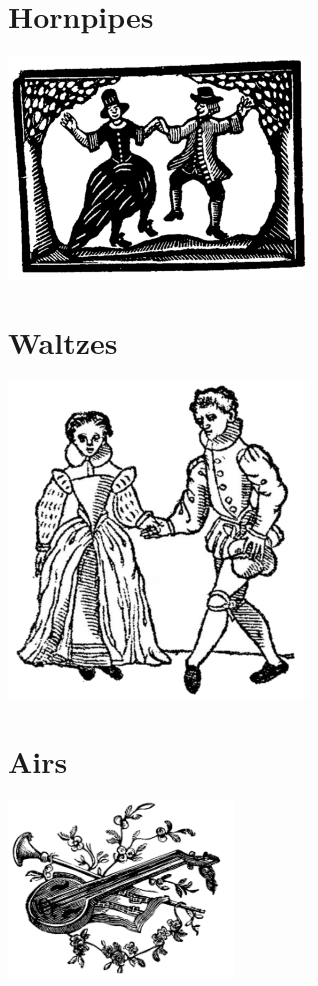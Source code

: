 \documentclass[12pt]{report}
\begin{document}
\chapter*{Hornpipes}
\begin{center}
\includegraphics[width=8cm]{../images/hornpipes}
\end{center}

\chapter*{Waltzes}
\begin{center}
\includegraphics[width=8cm]{../images/waltzes}
\end{center}


\chapter*{Airs}
\begin{center}
\includegraphics[width=6cm]{../images/misc}
\end{center}


\end{document}
